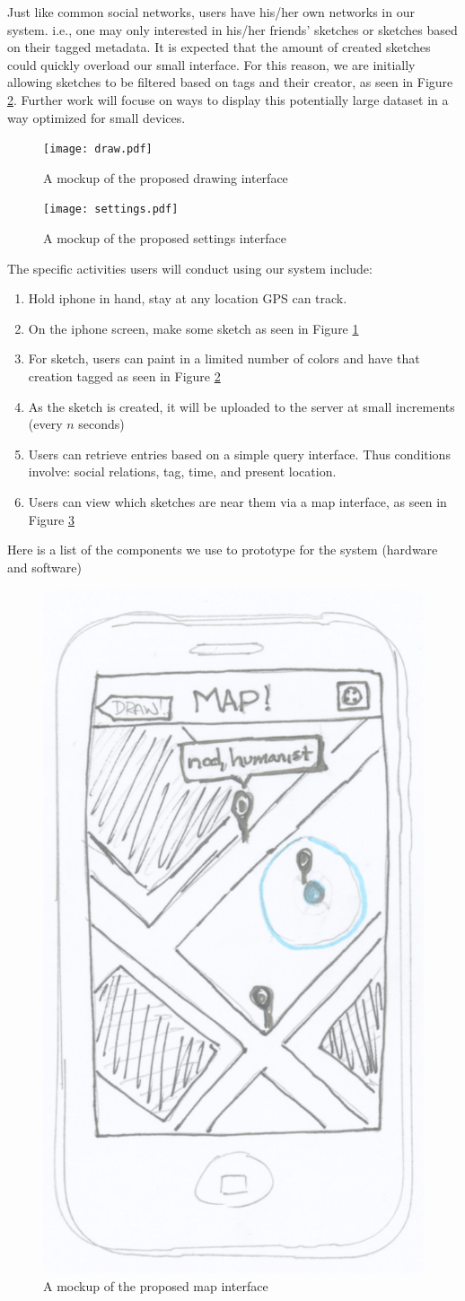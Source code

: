 \documentclass{chi2009}
\begin{document}
Just like common social networks, users have his/her own networks in our
system. i.e., one may only interested in his/her friends' sketches or sketches
based on their tagged metadata.  It is expected that the amount of created
sketches could quickly overload our small interface.  For this reason, we are
initially allowing sketches to be filtered based on tags and their creator, as
seen in Figure \ref{fig:settings}.  Further work will focuse on ways to display
this potentially large dataset in a way optimized for small devices.

\begin{figure}
\centering
\texttt{[image: draw.pdf]}
\caption{A mockup of the proposed drawing interface}
\label{fig:draw}
\end{figure}

\begin{figure}
\centering
\texttt{[image: settings.pdf]}
\caption{A mockup of the proposed settings interface}
\label{fig:settings}
\end{figure}

The specific activities users will conduct using our system include:
\begin{enumerate}
\item Hold iphone in hand, stay at any location GPS can track.
\item On the iphone screen, make some sketch as seen in Figure \ref{fig:draw}
\item For sketch, users can paint in a limited number of colors and have that
	creation tagged as seen in Figure \ref{fig:settings}
\item As the sketch is created, it will be uploaded to the server at small
	increments (every $n$ seconds)
\item Users can retrieve entries based on a simple query interface. Thus
	conditions involve: social relations, tag, time, and present location.
\item Users can view which sketches are near them via a map interface, as seen
	in Figure \ref{fig:map}
\end{enumerate}

Here is a list of the components we use to prototype for
the system (hardware and software)

\begin{figure}
\centering
\includegraphics[width=.3\textwidth]{map.pdf}
\caption{A mockup of the proposed map interface}
\label{fig:map}
\end{figure}
\end{document}

